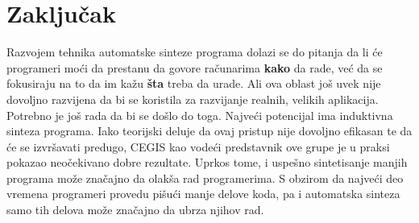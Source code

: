 \section{Zaključak}
\label{sec:zakljucak}

Razvojem tehnika automatske sinteze programa dolazi se do pitanja da li će programeri moći da prestanu da govore računarima \textbf{kako} da rade, već da se fokusiraju na to da im kažu \textbf{šta} treba da urade. Ali ova oblast još uvek nije dovoljno razvijena da bi se koristila za razvijanje realnih, velikih aplikacija. Potrebno je još rada da bi se došlo do toga. Najveći potencijal ima induktivna sinteza programa.
Iako teorijski deluje da ovaj pristup nije dovoljno efikasan te da će se izvršavati predugo, CEGIS kao vodeći predstavnik ove grupe je u praksi pokazao neočekivano dobre rezultate. Uprkos tome, i uspešno sintetisanje manjih programa može značajno da olakša rad programerima. S obzirom da najveći deo vremena programeri provedu pišući manje delove koda, pa i automatska sinteza samo tih delova može značajno da ubrza njihov rad.
